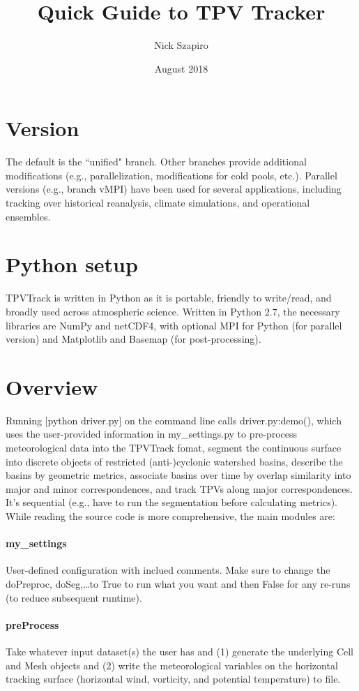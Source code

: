 \documentclass[a4paper]{article}
\title{Quick Guide to TPV Tracker}
\author{Nick Szapiro}
\date{August 2018}
\begin{document}
\maketitle

\section{Version}
The default is the ``unified" branch. Other branches provide additional modifications (e.g., parallelization, modifications for cold pools, etc.). Parallel versions (e.g., branch vMPI) have been used for several applications, including tracking over historical reanalysis, climate simulations, and operational ensembles.

\section{Python setup}
TPVTrack is written in Python as it is portable, friendly to write/read, and broadly used across atmospheric science.
Written in Python 2.7, the necessary libraries are NumPy and netCDF4, with optional MPI for Python (for parallel version) and Matplotlib and Basemap (for post-processing).

\section{Overview}
Running [python driver.py] on the command line calls driver.py:demo(), which uses the user-provided information in my\_settings.py to pre-process meteorological data into the TPVTrack fomat, segment the continuous surface into discrete objects of restricted (anti-)cyclonic watershed basins, describe the basins by geometric metrics, associate basins over time by overlap similarity into major and minor correspondences, and track TPVs along major correspondences. It's sequential (e.g., have to run the segmentation before calculating metrics). While reading the source code is more comprehensive, the main modules are:

\paragraph{my\_settings} User-defined configuration with inclued comments. Make sure to change the doPreproc, doSeg,\dots to True to run what you want and then False for any re-runs (to reduce subsequent runtime).

\paragraph{preProcess} Take whatever input dataset(s) the user has and (1) generate the underlying Cell and Mesh objects and (2) write the meteorological variables on the horizontal tracking surface (horizontal wind, vorticity, and potential temperature) to file.
\end{document}

